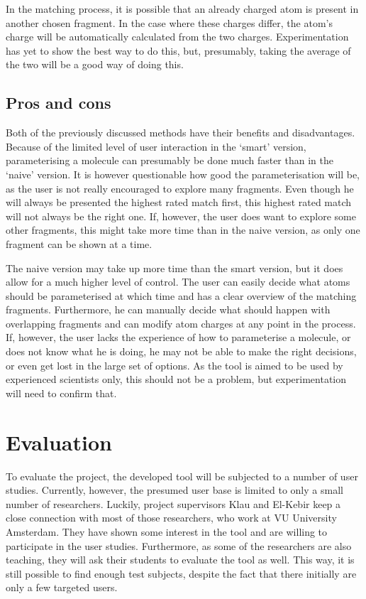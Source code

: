 \noindent
In the matching process, it is possible that an already charged atom is present in another chosen fragment. In the case where these charges differ, the atom's charge will be automatically calculated from the two charges. Experimentation has yet to show the best way to do this, but, presumably, taking the average of the two will be a good way of doing this.


\subsection{Pros and cons}
Both of the previously discussed methods have their benefits and disadvantages. Because of the limited level of user interaction in the `smart' version, parameterising a molecule can presumably be done much faster than in the `naive'  version. It is however questionable how good the parameterisation will be, as the user is not really encouraged to explore many fragments. Even though he will always be presented the highest rated match first, this highest rated match will not always be the right one. If, however, the user does want to explore some other fragments, this might take more time than in the naive version, as only one fragment can be shown at a time.

The naive version may take up more time than the smart version, but it does allow for a much higher level of control. The user can easily decide what atoms should be parameterised at which time and has a clear overview of the matching fragments. Furthermore, he can manually decide what should happen with overlapping fragments and can modify atom charges at any point in the process. If, however, the user lacks the experience of how to parameterise a molecule, or does not know what he is doing, he may not be able to make the right decisions, or even get lost in the large set of options. As the tool is aimed to be used by experienced scientists only, this should not be a problem, but experimentation will need to confirm that.


\section{Evaluation}

To evaluate the project, the developed tool will be subjected to a number of user studies. Currently, however, the presumed user base is limited to only a small number of researchers. Luckily, project supervisors Klau and El-Kebir keep a close connection with most of those researchers, who work at VU University Amsterdam. They have shown some interest in the tool and are willing to participate in the user studies. Furthermore, as some of the researchers are also teaching, they will ask their students to evaluate the tool as well. This way, it is still possible to find enough test subjects, despite the fact that there  initially are only a few targeted users.

